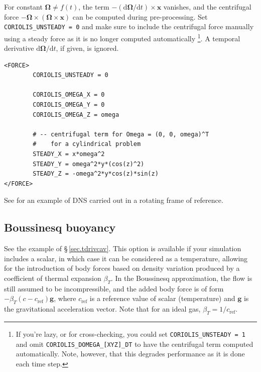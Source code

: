 \documentclass[11pt]{report}
\newcommand\cd{\mathrm{d}} \newcommand\cD{\mathrm{D}}
\begin{document}
\noindent 
For constant $\bm{\Omega}\neq f(t)$, the term
$-(\cd\bm{\Omega}/\cd t)\times\bm{x}$ vanishes, and the centrifugal
force $-\bm{\Omega} \times (\bm{\Omega} \times \bm{x})$ can be
computed during pre-processing.
%
Set \verb|CORIOLIS_UNSTEADY = 0| and make sure to include the centrifugal
force manually using a steady force as it is no longer computed automatically%
\footnote{If you're lazy, or for cross-checking, you could set
  \texttt{CORIOLIS\_UNSTEADY = 1} and omit
  \texttt{CORIOLIS\_DOMEGA\_[XYZ]\_DT} to have the centrifugal term
  computed automatically. Note, however, that this degrades
  performance as it is done each time step.}.  A temporal derivative
$\cd\bm{\Omega}/\cd t$, if given, is ignored.

\begin{verbatim}
<FORCE>
        CORIOLIS_UNSTEADY = 0

        CORIOLIS_OMEGA_X = 0
        CORIOLIS_OMEGA_Y = 0
        CORIOLIS_OMEGA_Z = omega

        # -- centrifugal term for Omega = (0, 0, omega)^T
        #    for a cylindrical problem
        STEADY_X = x*omega^2
        STEADY_Y = omega^2*y*(cos(z)^2)
        STEADY_Z = -omega^2*y*cos(z)*sin(z)
</FORCE>
\end{verbatim}


See \citet{ablmm15} for an example of DNS carried out in a rotating
frame of reference.

\subsection{Boussinesq buoyancy}
\label{sec.bous}

See the example of \S\,\ref{sec.tdrivcav}. This option is available if
your simulation includes a scalar, in which case it can be considered
as a temperature, allowing for the introduction of body forces based
on density variation produced by a coefficient of thermal expansion
$\beta_T$.  In the Boussinesq approximation, the flow is still assumed
to be incompressible, and the added body force is of form
$-\beta_T(c-c_\textrm{ref})\bm{g}$, where $c_\textrm{ref}$ is a
reference value of scalar (\ie temperature) and $\bm{g}$ is the
gravitational acceleration vector.  Note that for an ideal gas,
$\beta_T=1/c_\textrm{ref}$.
\end{document}
